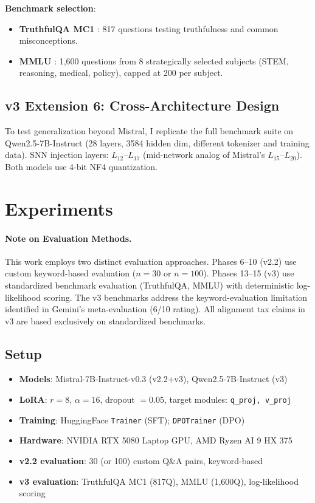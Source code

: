 \documentclass[11pt,a4paper]{article}
\begin{document}
\textbf{Benchmark selection}:
\begin{itemize}
    \item \textbf{TruthfulQA MC1} \cite{lin2022truthfulqa}: 817 questions testing truthfulness and common misconceptions.
    \item \textbf{MMLU} \cite{hendrycks2021mmlu}: 1,600 questions from 8 strategically selected subjects (STEM, reasoning, medical, policy), capped at 200 per subject.
\end{itemize}

\subsection{v3 Extension 6: Cross-Architecture Design}

To test generalization beyond Mistral, I replicate the full benchmark suite on Qwen2.5-7B-Instruct \cite{qwen2025} (28 layers, 3584 hidden dim, different tokenizer and training data). SNN injection layers: $L_{12}$--$L_{17}$ (mid-network analog of Mistral's $L_{15}$--$L_{20}$). Both models use 4-bit NF4 quantization.

\section{Experiments}

\paragraph{Note on Evaluation Methods.} This work employs two distinct evaluation approaches. Phases 6--10 (v2.2) use custom keyword-based evaluation ($n=30$ or $n=100$). Phases 13--15 (v3) use standardized benchmark evaluation (TruthfulQA, MMLU) with deterministic log-likelihood scoring. The v3 benchmarks address the keyword-evaluation limitation identified in Gemini's meta-evaluation (6/10 rating). All alignment tax claims in v3 are based exclusively on standardized benchmarks.

\subsection{Setup}
\begin{itemize}
    \item \textbf{Models}: Mistral-7B-Instruct-v0.3 (v2.2+v3), Qwen2.5-7B-Instruct (v3)
    \item \textbf{LoRA}: $r=8$, $\alpha=16$, dropout $= 0.05$, target modules: \texttt{q\_proj, v\_proj}
    \item \textbf{Training}: HuggingFace \texttt{Trainer} (SFT); \texttt{DPOTrainer} (DPO)
    \item \textbf{Hardware}: NVIDIA RTX 5080 Laptop GPU, AMD Ryzen AI 9 HX 375
    \item \textbf{v2.2 evaluation}: 30 (or 100) custom Q\&A pairs, keyword-based
    \item \textbf{v3 evaluation}: TruthfulQA MC1 (817Q), MMLU (1,600Q), log-likelihood scoring
\end{itemize}
\end{document}
